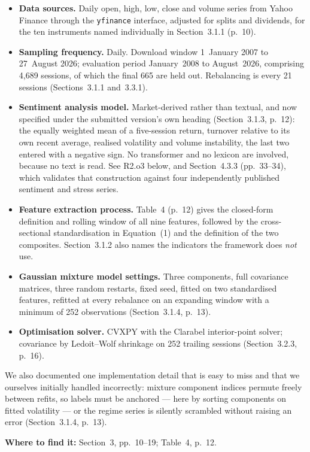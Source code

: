 \documentclass[11pt,a4paper]{article}
\newcommand{\where}[1]{\par\smallskip\noindent\textcolor{blue!55!black}{\textbf{Where to find it:} #1}\par}
\begin{document}
\begin{itemize}
\item \textbf{Data sources.} Daily open, high, low, close and volume series from Yahoo
Finance through the \texttt{yfinance} interface, adjusted for splits and dividends, for the
ten instruments named individually in Section~3.1.1 (p.~10).
\item \textbf{Sampling frequency.} Daily. Download window 1~January 2007 to 27~August 2026;
evaluation period January~2008 to August~2026, comprising 4{,}689 sessions, of which the
final 665 are held out. Rebalancing is every 21 sessions (Sections~3.1.1 and~3.3.1).
\item \textbf{Sentiment analysis model.} Market-derived rather than textual, and now
specified under the submitted version's own heading (Section~3.1.3, p.~12): the equally
weighted mean of a five-session return, turnover relative to its own recent average,
realised volatility and volume instability, the last two entered with a negative sign. No
transformer and no lexicon are involved, because no text is read. See R2.o3 below, and
Section~4.3.3 (pp.~33--34), which validates that construction against four independently
published sentiment and stress series.
\item \textbf{Feature extraction process.} Table~4 (p.~12) gives the closed-form
definition and rolling window of all nine features, followed by the cross-sectional
standardisation in Equation~(1) and the definition of the two composites. Section~3.1.2
also names the indicators the framework does \emph{not} use.
\item \textbf{Gaussian mixture model settings.} Three components, full covariance matrices,
three random restarts, fixed seed, fitted on two standardised features, refitted at every
rebalance on an expanding window with a minimum of 252 observations (Section~3.1.4, p.~13).
\item \textbf{Optimisation solver.} CVXPY with the Clarabel interior-point solver;
covariance by Ledoit--Wolf shrinkage on 252 trailing sessions (Section~3.2.3, p.~16).
\end{itemize}

We also documented one implementation detail that is easy to miss and that we ourselves
initially handled incorrectly: mixture component indices permute freely between refits, so
labels must be anchored --- here by sorting components on fitted volatility --- or the
regime series is silently scrambled without raising an error (Section~3.1.4, p.~13).
\where{Section~3, pp.~10--19; Table~4, p.~12.}
\end{document}
